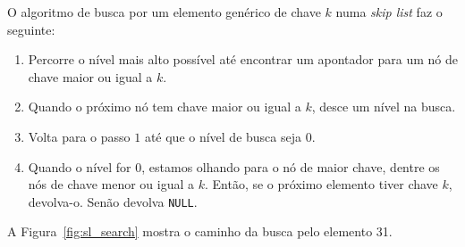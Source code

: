 \documentclass[paper=a4, fontsize=11pt]{scrartcl} %
\numberwithin{equation}{section}
\numberwithin{figure}{section}
\numberwithin{table}{section}
\numberwithin{definition}{section}
\numberwithin{theorem}{section}
\numberwithin{property}{section}
\numberwithin{proposition}{section}
\newcommand{\skl}{\textit{skip list}\xspace}
\begin{document}
O algoritmo de busca por um elemento genérico de chave $k$ numa \skl faz o seguinte:
\begin{enumerate}
  \item Percorre o nível mais alto possível até encontrar um apontador para um nó de chave maior ou igual
a $k$.
  \item Quando o próximo nó tem chave maior ou igual a $k$, desce um nível na busca.
  \item Volta para o passo $1$ até que o nível de busca seja $0$.
  \item Quando o nível for $0$, estamos olhando para o nó de maior chave, dentre os nós de chave 
  menor ou igual a $k$. Então, se o próximo elemento tiver chave $k$, devolva-o. Senão devolva \verb|NULL|.
\end{enumerate}

A Figura~\ref{fig:sl_search} mostra o caminho da busca pelo elemento 31.
\end{document}

